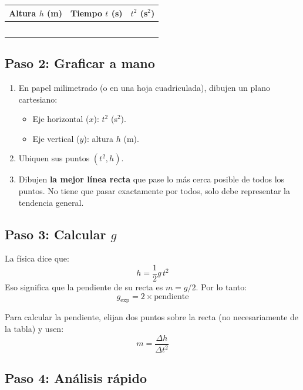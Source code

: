 \documentclass[11pt, letterpaper]{article}
\begin{document}
	\begin{center}
		\begin{tabular}{|c|c|c|}
			\hline
			Altura $h$ (m) & Tiempo $t$ (s) & $t^2$ (s$^2$) \\
			\hline
			& & \\
			& & \\
			& & \\
			& & \\
			& & \\
			\hline
		\end{tabular}
	\end{center}
	
	\subsection{Paso 2: Graficar a mano}
	
	\begin{enumerate}
		\item En papel milimetrado (o en una hoja cuadriculada), dibujen un plano cartesiano:
		\begin{itemize}
			\item Eje horizontal ($x$): $t^2$ (s$^2$).
			\item Eje vertical ($y$): altura $h$ (m).
		\end{itemize}
		
		\item Ubiquen sus puntos $(t^2, h)$.
		
		\item Dibujen \textbf{la mejor línea recta} que pase lo más cerca posible de todos los puntos. No tiene que pasar exactamente por todos, solo debe representar la tendencia general.
	\end{enumerate}
	
	\subsection{Paso 3: Calcular $g$}
	
	La física dice que:
	\[
	h = \frac{1}{2} g \, t^2
	\]
	Eso significa que la pendiente de su recta es $m = g/2$. Por lo tanto:
	\[
	g_{\text{exp}} = 2 \times \text{pendiente}
	\]
	
	Para calcular la pendiente, elijan dos puntos sobre la recta (no necesariamente de la tabla) y usen:
	\[
	m = \frac{\Delta h}{\Delta t^2}
	\]
	
	\subsection{Paso 4: Análisis rápido}
	
\end{document}
